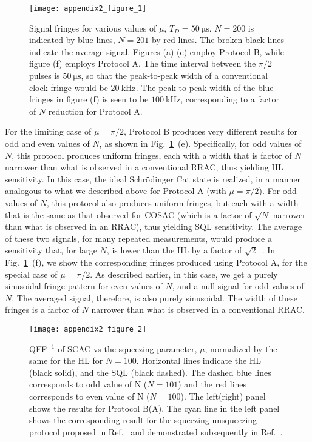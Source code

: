 \documentclass[aps,pra,letterpaper,superscriptaddress,showpacs,amsmath,floats,twocolumn]{revtex4-1}
\begin{document}
\begin{figure}[h]
\texttt{[image: appendix2\_figure\_1]}
\caption{Signal fringes for various values of $\mu$, $T_D=\SI{50}{\micro\second}$. $N=200$ is indicated by blue lines, $N=201$ by red lines. The broken black lines indicate the average signal. Figures (a)-(e) employ Protocol B, while figure (f) employs Protocol A. The time interval between the $\pi/2$ pulses is $\SI{50}{\micro\second}$, so that the peak-to-peak width of a conventional clock fringe would be $\SI{20}{\kilo\hertz}$. The peak-to-peak width of the blue fringes in figure (f) is seen to be $\SI{100}{\kilo\hertz}$, corresponding to a factor of $N$ reduction for Protocol A.}
\label{app2-fig:1}
\end{figure}
%

For the limiting case of $\mu=\pi/2$, Protocol B produces very different results for odd and even values of $N$, as shown in Fig.~\ref{app2-fig:1}~(e). Specifically, for odd values of $N$, this protocol produces uniform fringes, each with a width that is factor of $N$ narrower than what is observed in a conventional RRAC, thus yielding HL sensitivity. In this case, the ideal Schr\"odinger Cat state is realized, in a manner analogous to what we described above for Protocol A (with $\mu=\pi/2$). For odd values of $N$, this protocol also produces uniform fringes, but each with a width that is the same as that observed for COSAC (which is a factor of $\sqrt{N}$ narrower than what is observed in an RRAC), thus yielding SQL sensitivity. The average of these two signals, for many repeated measurements, would produce a sensitivity that, for large $N$, is lower than the HL by a factor of $\sqrt{2}$~\cite{Shahriar2}. In Fig.~\ref{app2-fig:1}~(f), we show the corresponding fringes produced using Protocol A, for the special case of $\mu=\pi/2$. As described earlier, in this case, we get a purely sinusoidal fringe pattern for even values of $N$, and a null signal for odd values of $N$. The averaged signal, therefore, is also purely sinusoidal. The width of these fringes is a factor of $N$ narrower than what is observed in a conventional RRAC.

\begin{figure}[h]
\texttt{[image: appendix2\_figure\_2]}
\caption{QFF$^{-1}$ of SCAC vs the squeezing parameter, $\mu$, normalized by the same for the HL for $N=100$. Horizontal lines indicate the HL (black solid), and the SQL (black dashed). The dashed blue lines corresponds to odd value of N ($N=101$) and the red lines corresponds to even value of N ($N=100$). The left(right) panel shows the results for Protocol B(A). The cyan line in the left panel shows the corresponding result for the squeezing-unsqueezing protocol proposed in Ref.~\cite{Antisqz} and demonstrated subsequently in Ref.~\cite{Antisqzexpt}.}
\label{app2-fig:2}
\end{figure}
%
\end{document}
